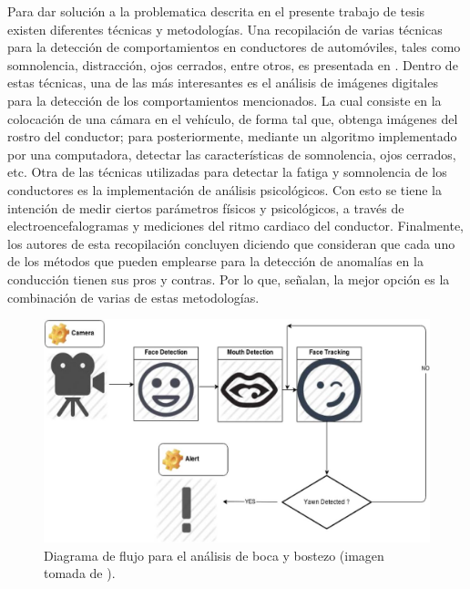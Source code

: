 Para dar solución a la problematica descrita en el presente trabajo de tesis existen diferentes técnicas y metodologías.
Una recopilación de varias técnicas para la detección de comportamientos en conductores de automóviles, tales como somnolencia, distracción, ojos cerrados, entre otros, es presentada en \cite{7225158}.
Dentro de estas técnicas, una de las más interesantes es el análisis de imágenes digitales para la detección de los comportamientos mencionados. 
La cual consiste en la colocación de una cámara en el vehículo, de forma tal que, obtenga imágenes del rostro del conductor; para posteriormente, mediante un algoritmo implementado por una computadora, detectar las características de somnolencia, ojos cerrados, etc. 
Otra de las técnicas utilizadas para detectar la fatiga y somnolencia de los conductores es la implementación de análisis psicológicos. 
Con esto se tiene la intención de medir ciertos parámetros físicos y psicológicos, a través de electroencefalogramas y mediciones del ritmo cardiaco del conductor. 
Finalmente, los autores de esta recopilación concluyen diciendo que consideran que cada uno de los métodos que pueden emplearse para la detección de anomalías en la conducción tienen sus pros y contras. 
Por lo que, señalan, la mejor opción es la combinación de varias de estas metodologías.

\begin{figure}[H]
\centering
\includegraphics[scale=0.3]{6.png}
\caption{Diagrama de flujo para el análisis de boca y bostezo (imagen tomada de \cite{7225158}).}
\label{6}
\end{figure}


